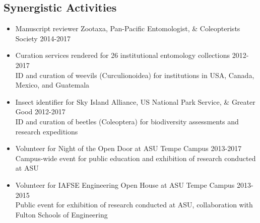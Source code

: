 \documentclass[11pt,a4paper]{extarticle}
\begin{document}
\subsection*{Synergistic Activities}
	\begin{itemize}
		\item Manuscript reviewer Zootaxa, Pan-Pacific Entomologist, \& Coleopterists Society \tabto*{5.65in} 2014-2017
		\item Curation services rendered for 26 institutional entomology collections \tabto*{5.65in} 2012-2017
		\\
		ID and curation of weevils (Curculionoidea) for institutions in USA, Canada, Mexico, and Guatemala
		\item Insect identifier for Sky Island Alliance, US National Park Service, \& Greater Good \tabto*{5.65in} 2012-2017
		\\
		ID and curation of beetles (Coleoptera) for biodiversity assessments and research expeditions
		\item Volunteer for Night of the Open Door at ASU Tempe Campus \tabto*{5.65in} 2013-2017
		\\
		Campus-wide event for public education and exhibition of research conducted at ASU
		\item Volunteer for IAFSE Engineering Open House at ASU Tempe Campus \tabto*{5.65in} 2013-2015
		\\
		Public event for exhibition of research conducted at ASU, collaboration with Fulton Schools of Engineering
	\end{itemize}
	
\end{document}
